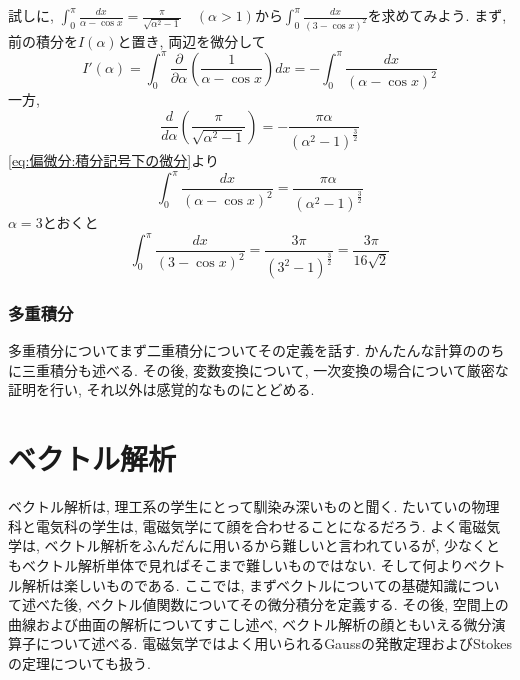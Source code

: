 \documentclass[a4j,dvipdfmx]{jsarticle}
\numberwithin{equation}{section}
\begin{document}
            試しに, $\displaystyle\int_{0}^{\pi}\frac{dx}{\alpha-\cos x}=\frac{\pi}{\sqrt{\alpha^2-1}}\quad(\alpha>1)$から$\displaystyle\int_{0}^{\pi}\frac{dx}{(3-\cos x)^2}$を求めてみよう.
            まず, 前の積分を$I(\alpha)$と置き, 両辺を微分して
            \begin{equation*}
                I'(\alpha) = \int_{0}^{\pi}\frac{\partial}{\partial\alpha}\left(\frac{1}{\alpha-\cos x}\right)dx = -\int_0^\pi\frac{dx}{(\alpha-\cos x)^2}
            \end{equation*}
            一方,
            \begin{equation*}
                \frac{d}{d\alpha}\left(\frac{\pi}{\sqrt{\alpha^2-1}}\right)=-\frac{\pi\alpha}{(\alpha^2-1)^{\frac{3}{2}}}
            \end{equation*}
            \eqref{eq:偏微分:積分記号下の微分}より
            \begin{equation*}
                \int_0^\pi\frac{dx}{(\alpha-\cos x)^2}=\frac{\pi\alpha}{(\alpha^2-1)^{\frac{3}{2}}}
            \end{equation*}
            $\alpha=3$とおくと
            \begin{equation*}
                \int_0^\pi\frac{dx}{(3-\cos x)^2}=\frac{3\pi}{(3^2-1)^{\frac{3}{2}}}=\frac{3\pi}{16\sqrt{2}} 
            \end{equation*}
        \clearpage
            
    \clearpage
    \section{多重積分}
        多重積分についてまず二重積分についてその定義を話す. かんたんな計算ののちに三重積分も述べる. その後, 変数変換について, 一次変換の場合について厳密な証明を行い, 
        それ以外は感覚的なものにとどめる.

    \clearpage
    
    \part{ベクトル解析}
    \begin{screen}
        ベクトル解析は, 理工系の学生にとって馴染み深いものと聞く. たいていの物理科と電気科の学生は, 電磁気学にて顔を合わせることになるだろう.
        よく電磁気学は, ベクトル解析をふんだんに用いるから難しいと言われているが, 少なくともベクトル解析単体で見ればそこまで難しいものではない. 
        そして何よりベクトル解析は楽しいものである. ここでは, まずベクトルについての基礎知識について述べた後, ベクトル値関数についてその微分積分を定義する.
        その後, 空間上の曲線および曲面の解析についてすこし述べ, ベクトル解析の顔ともいえる微分演算子について述べる.
        電磁気学ではよく用いられるGaussの発散定理およびStokesの定理についても扱う. 
    \end{screen}
    \clearpage
\end{document}
